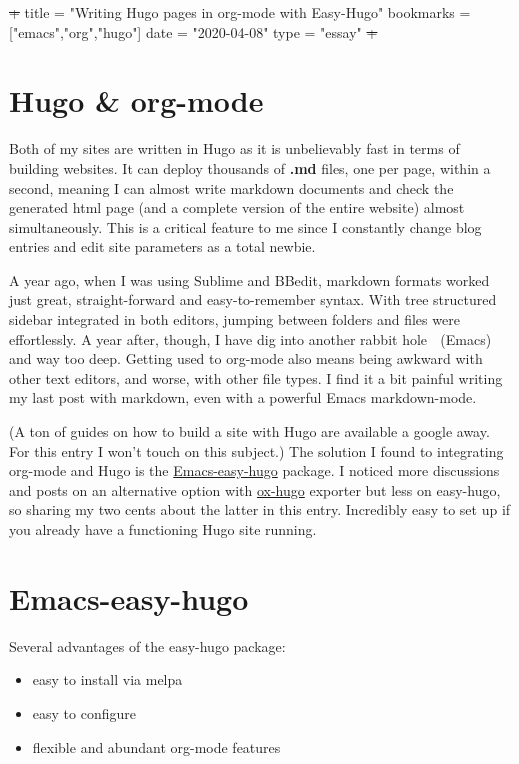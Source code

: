 \documentclass[11pt]{article}
\author{Congying Wang}
\date{\today}
\title{}
\begin{document}
\tableofcontents \clearpage\sout{+}
title = "Writing Hugo pages in org-mode with Easy-Hugo"
bookmarks = ["emacs","org","hugo"]
date = "2020-04-08"
type = "essay"
\sout{+}

\section{Hugo \& org-mode}
\label{sec:org4936cea}

Both of my sites are written in Hugo as it is unbelievably fast in terms of building websites. It can deploy thousands of \textbf{.md} files, one per page, within a second, meaning I can almost write markdown documents and check the generated html page (and a complete version of the entire website) almost simultaneously. This is a critical feature to me since I constantly change blog entries and edit site parameters as a total newbie. 

A year ago, when I was using Sublime and BBedit, markdown formats worked just great, straight-forward and easy-to-remember syntax. With tree structured sidebar integrated in both editors, jumping between folders and files were effortlessly. A year after, though, I have dig into another rabbit hole 🐇 (Emacs) and way too deep. Getting used to org-mode also means being awkward with other text editors, and worse, with other file types. I find it a bit painful writing my last post with markdown, even with a powerful Emacs markdown-mode.

(A ton of guides on how to build a site with Hugo are available a google away. For this entry I won't touch on this subject.) The solution I found to integrating org-mode and Hugo is the \href{https://github.com/masasam/emacs-easy-hugo}{Emacs-easy-hugo} package. I noticed more discussions and posts on an alternative option with \href{https://github.com/kaushalmodi/ox-hugo}{ox-hugo} exporter but less on easy-hugo, so sharing my two cents about the latter in this entry. Incredibly easy to set up if you already have a functioning Hugo site running.

\section{Emacs-easy-hugo}
\label{sec:orgf2f3efe}
Several advantages of the easy-hugo package:

\begin{itemize}
\item easy to install via melpa
\item easy to configure
\item flexible and abundant org-mode features
\end{itemize}
\end{document}
